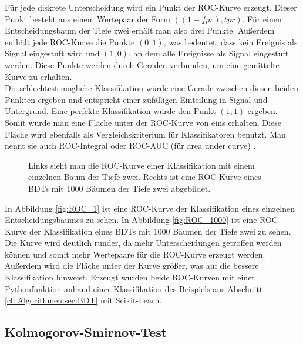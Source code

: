 F\"ur jede diskrete Unterscheidung wird ein Punkt der ROC-Kurve erzeugt. Dieser Punkt besteht aus einem Wertepaar der Form $((1-fpr),tpr)$. F\"ur einen Entscheidungsbaum der Tiefe zwei erh\"alt man also drei Punkte. Au\ss erdem enth\"alt jede ROC-Kurve die Punkte $(0,1)$, was bedeutet, dass kein Ereignis als Signal eingestuft wird und $(1,0)$, an dem alle Ereignisse als Signal eingestuft werden. Diese Punkte werden durch Geraden verbunden, um eine gemittelte Kurve zu erhalten.\\
Die schlechtest m\"ogliche Klassifikation w\"urde eine Gerade zwischen diesen beiden Punkten ergeben und entspricht einer zuf\"alligen Einteilung in Signal und Untergrund. Eine perfekte Klassifikation w\"urde den Punkt $(1,1)$ ergeben. Somit w\"urde man eine Fl\"ache unter der ROC-Kurve von eins erhalten. Diese Fl\"ache wird ebenfalls als Vergleichskriterium f\"ur Klassifikatoren benutzt. Man nennt sie auch ROC-Integral oder ROC-AUC (f\"ur area under curve) \cite{ROC_Graphs}.

\begin{figure}[tbp]
\centering     %
{}
\caption{Links sieht man die ROC-Kurve einer Klassifikation mit einem einzelnen Baum der Tiefe zwei. Rechts ist eine ROC-Kurve eines BDTs mit 1000 B\"aumen der Tiefe zwei abgebildet.}
\end{figure}

In Abbildung \ref{fig:ROC_1} ist eine ROC-Kurve der Klassifikation eines einzelnen Entscheidungsbaumes zu sehen. In Abbildung \ref{fig:ROC_1000} ist eine ROC-Kurve der Klassifikation eines BDTs mit 1000 B\"aumen der Tiefe zwei zu sehen. Die Kurve wird deutlich runder, da mehr Unterscheidungen getroffen werden k\"onnen und somit mehr Wertepaare f\"ur die ROC-Kurve erzeugt werden. Au\ss erdem wird die Fl\"ache unter der Kurve gr\"o\ss er, was auf die bessere Klassifikation hinweist.
Erzeugt wurden beide ROC-Kurven mit einer Pythonfunktion anhand einer Klassifikation des Beispiels aus Abschnitt \ref{ch:Algorithmen:sec:BDT} mit Scikit-Learn.

\subsection{Kolmogorov-Smirnov-Test}
\label{ch:Vergleich:subsec:KSTest}

